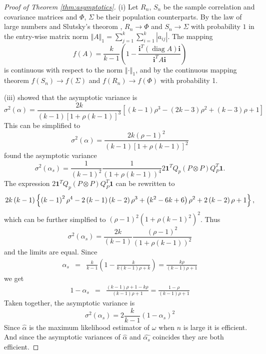 \documentclass[twoside]{article}
\DeclareMathOperator{\diag}{diag}
\begin{document}
\begin{proof}[Proof of Theorem \ref{thm:asymptotics}]\label{proof:asymptotics}
(i) Let $R_{n}$, $S_{n}$ be the sample correlation and covariance matrices
and $\Phi$, $\Sigma$ be their population counterparts. By the law
of large numbers and Slutsky's theorom \citep[][Lemma 2.8, p. 11]{Van_der_Vaart2000-qc}, $R_{n}\to\Phi$ and $S_{n}\to\Sigma$
with probability $1$ in the entry-wise matrix norm $\left\Vert A\right\Vert _{1}=\sum_{j=1}^{k}\sum_{i=1}^{k}\left|a_{ij}\right|$.
The mapping
\[
f\left(A\right)=\frac{k}{k-1}\left(1-\frac{\mathbf{i}^{T}(\diag A)\mathbf{i}}{\mathbf{i}^{T}A\mathbf{i}}\right)
\]
is continuous with respect to the norm $\left\Vert \cdot\right\Vert _{1}$,
and by the continuous mapping theorem \citep[][Theorem 2.3, p. 7]{Van_der_Vaart2000-qc}
$f\left(S_{n}\right)\to f\left(\Sigma\right)$ and $f\left(R_{n}\right)\to f\left(\Phi\right)$
with probability 1.

(iii) \citet[eq. 22]{Van_Zyl2000-si} showed that the asymptotic variance
is
\[
\sigma^{2}\left(\alpha\right)=\frac{2k}{\left(k-1\right)\left[1+\rho\left(k-1\right)\right]^{3}}\left[\left(k-1\right)\rho^{3}-\left(2k-3\right)\rho^{2}+\left(k-3\right)\rho+1\right]
\]
This can be simplified to
\[
\sigma^{2}\left(\alpha\right)=\frac{2k\left(\rho-1\right)^{2}}{\left(k-1\right)\left[1+\rho\left(k-1\right)\right]^{2}}
\]
\citet[equation 10]{hayashi2005note} found the asymptotic variance
\[
\sigma^{2}\left(\alpha_{s}\right)=\frac{1}{\left(k-1\right)^{2}}\frac{1}{\left(1+\rho\left(k-1\right)\right)^{4}}2\mathbf{1}^{T}Q_{p}\left(P\otimes P\right)Q_{P}^{T}\mathbf{1}.
\]
The expression $2\mathbf{1}^{T}Q_{p}\left(P\otimes P\right)Q_{P}^{T}\mathbf{1}$
can be rewritten to \citep[appendix 3]{hayashi2005note}
\[
2k\left(k-1\right)\left\{ \left(k-1\right)^{2}\rho^{4}-2\left(k-1\right)\left(k-2\right)\rho^{3}+\left(k^{2}-6k+6\right)\text{\ensuremath{\rho^{2}+2\left(k-2\right)\rho+1}}\right\} ,
\]
which can be further simplfied to $\left(\rho-1\right)^{2}\left(1+\rho\left(k-1\right)^{2}\right)^{2}$.
Thus
\[
\sigma^{2}\left(\alpha_{s}\right)=\frac{2k}{\left(k-1\right)}\frac{\left(\rho-1\right)^{2}}{\left(1+\rho\left(k-1\right)\right)^{2}}
\]
and the limits are equal.
Since
\begin{eqnarray*}
\alpha_{s} & = & \frac{k}{k-1}\left(1-\frac{k}{k\left(k-1\right)\rho+k}\right) = \frac{k\rho}{\left(k-1\right)\rho+1}
\end{eqnarray*}
we get
\begin{eqnarray*}
1-\alpha_{s} & = & \frac{\left(k-1\right)\rho+1-k\rho}{\left(k-1\right)\rho+1} = \frac{1-\rho}{\left(k-1\right)\rho+1}
\end{eqnarray*}
Taken together, the asymptotic variance is
\[
\sigma^{2}\left(\alpha_{s}\right)=2\frac{k}{k-1}\left(1-\alpha_{s}\right)^{2}
\]
Since $\hat{\alpha}$ is the maximum likelihood estimator of $\omega$
when $n$ is large it is efficient. And since the asymptotic variances
of $\hat{\alpha}$ and $\hat{\alpha_{s}}$ coincides they
are both efficient.
\end{proof}
\end{document}
